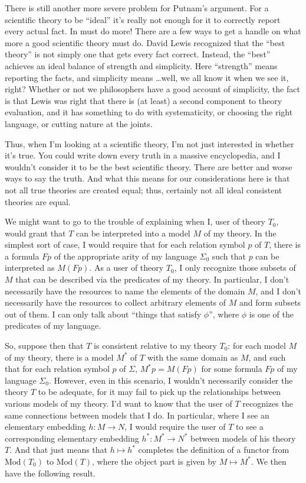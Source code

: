There is still another more severe problem for Putnam's argument.  For
a scientific theory to be ``ideal'' it's really not enough for it to
correctly report every actual fact.  In must do more!  There are a few
ways to get a handle on what more a good scientific theory must do.
David Lewis recognized that the ``best theory'' is not simply one that
gets every fact correct.  Instead, the ``best'' achieves an ideal
balance of strength and simplicity.  Here ``strength'' means reporting
the facts, and simplicity means \dots well, we all know it when we see
it, right?  Whether or not we philosophers have a good account of
simplicity, the fact is that Lewis was right that there is (at least)
a second component to theory evaluation, and it has something to do
with systematicity, or choosing the right language, or cutting nature
at the joints.

Thus, when I'm looking at a scientific theory, I'm not just interested
in whether it's true.  You could write down every truth in a massive
encyclopedia, and I wouldn't consider it to be the best scientific
theory.  There are better and worse ways to say the truth.  And what
this means for our considerations here is that not all true theories
are created equal; thus, certainly not all ideal consistent theories
are equal.

We might want to go to the trouble of explaining when I, user of
theory $T_0$, would grant that $T$ can be interpreted into a model $M$
of my theory.  In the simplest sort of case, I would require that for
each relation symbol $p$ of $T$, there is a formula $Fp$ of the
appropriate arity of my language $\Sigma _0$ such that $p$ can be
interpreted as $M(Fp)$.  As a user of theory $T_0$, I only recognize
those subsets of $M$ that can be described via the predicates of my
theory.  In particular, I don't necessarily have the resources to name
the elements of the domain $M$, and I don't necessarily have the
resources to collect arbitrary elements of $M$ and form subsets out of
them.  I can only talk about ``things that satisfy $\phi$'', where
$\phi$ is one of the predicates of my language.

So, suppose then that $T$ is consistent relative to my theory $T_0$:
for each model $M$ of my theory, there is a model $M^*$ of $T$ with
the same domain as $M$, and such that for each relation symbol $p$ of
$\Sigma$, $M^*p = M(Fp)$ for some formula $Fp$ of my language
$\Sigma _0$.  However, even in this scenario, I wouldn't necessarily
consider the theory $T$ to be adequate, for it may fail to pick up the
relationships between various models of my theory.  I'd want to know
that the user of $T$ recognizes the same connections between models
that I do.  In particular, where I see an elementary embedding
$h:M\to N$, I would require the user of $T$ to see a corresponding
elementary embedding $h^*:M^*\to N^*$ between models of his theory
$T$.  And that just means that $h\mapsto h^*$ completes the definition
of a functor from $\mathrm{Mod}(T_0)$ to $\mathrm{Mod}(T)$, where the
object part is given by $M\mapsto M^*$.  We then have the following
result.


